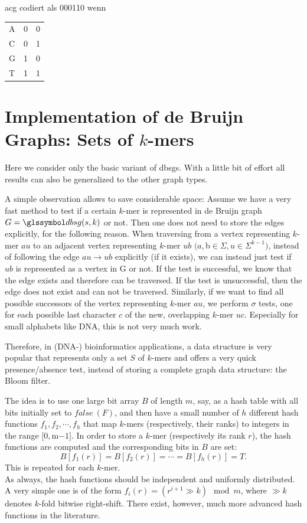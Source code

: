 \begin{bsp}
    acg codiert als 000110 wenn \\
    \begin{tabular}{lll}
        A & 0 & 0 \\
        C & 0 & 1 \\
        G & 1 & 0 \\
        T & 1 & 1
    \end{tabular}
\end{bsp}


\section{Implementation of de Bruijn Graphs: Sets of $k$-mers}\label{sec:implementation-of-de-bruijn-graphs:-sets-of-k-mers}

Here we consider only the basic variant of \glspl{dbsg}.
With a little bit of effort all results can also be generalized to the other graph types.

A simple observation allows to save considerable space: Assume we have a very fast method to test if a certain $k$-mer is represented in de Bruijn graph $G = \dbg(s, k)$ or not.
Then one does not need to store the edges explicitly, for the following reason.
When traversing from a vertex representing $k$-mer $au$ to an adjacent vertex representing $k$-mer $ub$ $(a, $b$ \in \Sigma, u \in  \Sigma^{k-1} )$, instead of following the edge $au \rightarrow ub$ explicitly (if it exists), we can instead just test if $ub$ is represented as a vertex in G or not.
If the test is successful, we know that the edge exists and therefore can be traversed.
If the test is unsuccessful, then the edge does not exist and can not be traversed.
Similarly, if we want to find all possible successors of the vertex representing $k$-mer $au$, we perform $\sigma$ tests, one for each possible last character $c$ of the new, overlapping $k$-mer $uc$.
Especially for small alphabets like DNA, this is not very much work.

Therefore, in (DNA-) bioinformatics applications, a data structure is very popular that represents only a set $S$ of $k$-mers and offers a very quick presence/absence test, instead of storing a complete graph data structure: the Bloom filter.

The idea is to use one large bit array $B$ of length $m$, say, as a hash table with all bits initially set to $false\ (F)$, and then have a small number of $h$ different hash functions $f_1 , f_2 , \cdots , f_h$ that map $k$-mers (respectively, their ranks) to integers in the range $[0, $m$ - 1]$.
In order to store a $k$-mer (respectively its rank $r$), the hash functions are computed and the corresponding bits in $B$ are set:
\[
    B[f_1 (r)] = B[f_2 (r)] = \cdots = B[f_h (r)] = T.
\]
This is repeated for each $k$-mer. \\
As always, the hash functions should be independent and uniformly distributed.
A very simple one is of the form $f_i (r) = (r^{i+1} \gg k) \mod m$, where $\gg k$ denotes $k$-fold bitwise right-shift.
There exist, however, much more advanced hash functions in the literature.

